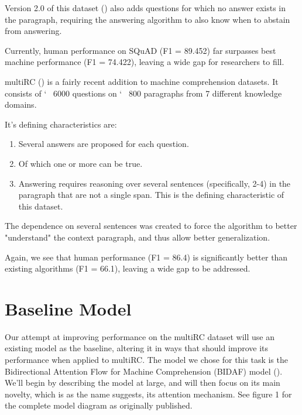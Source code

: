 \documentclass[12pt, a4paper]{article}
\begin{document}
\begin{multicols}{2}
			Version 2.0 of this dataset (\cite{Rajpurkar2018}) also adds questions for which no answer exists in the paragraph, requiring the answering algorithm to also know when to abstain from answering.
			
			Currently, human performance on SQuAD (F1 = 89.452) far surpasses best machine performance (F1 = 74.422), leaving a wide gap for researchers to fill.
			
			multiRC (\cite{N18-1023}) is a fairly recent addition to machine comprehension datasets. It consists of \char`~ 6000 questions on \char`~ 800 paragraphs from 7 different knowledge domains.
			
			It's defining characteristics are:
			\begin{enumerate}
				\item Several answers are proposed for each question.
				\item Of which one or more can be true.
				\item Answering requires reasoning over several sentences (specifically, 2-4) in the paragraph that are not a single span. This is the defining characteristic of this dataset.
			\end{enumerate}
		
			The dependence on several sentences was created to force the algorithm to better "understand" the context paragraph, and thus allow better generalization.
			
			Again, we see that human performance (F1 = 86.4) is significantly better than existing algorithms (F1 = 66.1), leaving a wide gap to be addressed.
			
		\section{Baseline Model}
		
			Our attempt at improving performance on the multiRC dataset will use an existing model as the baseline, altering it in ways that should improve its performance when applied to multiRC. The model we chose for this task is the Bidirectional Attention Flow for Machine Comprehension (BIDAF) model (\cite{Seo2016}). We'll begin by describing the model at large, and will then focus on its main novelty, which is as the name suggests, its attention mechanism. See figure 1 for the complete model diagram as originally published.
			

\end{multicols}
\end{document}
